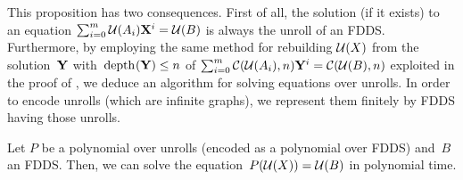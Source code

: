         This proposition has two consequences. 
        First of all, the solution (if it exists) to an equation $\sum_{i=0}^{m} \unroll{A_i} \forest{X}^i = \unroll{B}$ is always the unroll of an FDDS. 
        Furthermore, by employing the same method for rebuilding $\mathcal{U}(X)$ from the solution~$\forest{Y}$ with~$\depth{\forest{Y}} \le n$ of $\sum_{i=0}^{m}\cut{\unroll{A_i}}{n} \forest{y}^i = \cut{\unroll{B}}{n}$ exploited in the proof of \cite[Theorem 6]{kroot}, we deduce an algorithm for solving equations over unrolls. In order to encode unrolls (which are infinite graphs), we represent them finitely by FDDS having those unrolls.
        
		
		\begin{theorem}\label{theorem:equation_forest_P}
			Let $P$ be a polynomial over unrolls (encoded as a polynomial over FDDS) and~$B$ an FDDS.
			Then, we can solve the equation~$P(\mathcal{U}(X)) = \mathcal{U}(B)$ in polynomial time.
		\end{theorem} 	
	
